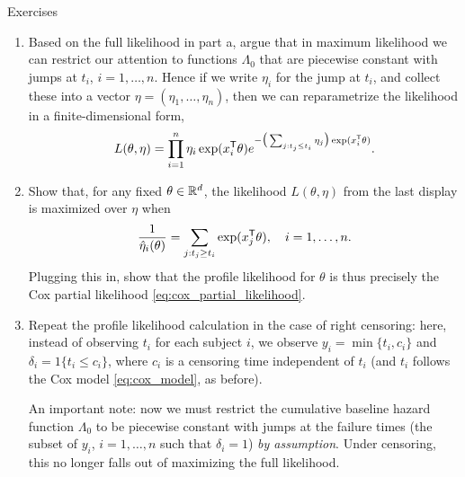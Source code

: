 \begin{xcb}{Exercises}
\begin{enumerate}[label=\thechapter.\arabic*]
\begin{enumerate}[label=\alph*.]
\item Based on the full likelihood in part a, argue that in maximum likelihood 
  we can restrict our attention to functions $\Lambda_0$ that are piecewise
  constant with jumps at $t_i$, $i=1,\dots,n$. Hence if we write $\eta_i$ for  
  the jump at $t_i$, and collect these into a vector $\eta = (\eta_1, \dots,
  \eta_n)$, then we can reparametrize the likelihood in a finite-dimensional
  form,     
  \[
  L(\theta, \eta) = \prod_{i=1}^n \eta_i \exp(x_i^{\mathsf{T}} \theta)
  e^{-\big(\sum_{j : t_j \leq t_i} \eta_j\big) \exp(x_i^{\mathsf{T}} \theta)}. 
  \]

\item Show that, for any fixed $\theta \in \mathbb{R}^d$, the likelihood $L(\theta,
  \eta)$ from the last display is maximized over $\eta$ when
  \[
  \frac{1}{\hat\eta_i(\theta)} = \sum_{j : t_j \geq t_i} \exp(x_j^{\mathsf{T}} \theta),
  \quad i=1,\dots,n. 
  \]
  Plugging this in, show that the profile likelihood for $\theta$ is thus
  precisely the Cox partial likelihood \eqref{eq:cox_partial_likelihood}. 

\item Repeat the profile likelihood calculation in the case of right censoring:
  here, instead of observing $t_i$ for each subject $i$, we observe $y_i =
  \min\{t_i, c_i\}$ and $\delta_i = 1\{t_i \leq c_i\}$, where $c_i$ is a
  censoring time independent of $t_i$ (and $t_i$ follows the Cox model
  \eqref{eq:cox_model}, as before).     

  \smallskip
  An important note: now we must restrict the cumulative baseline hazard
  function $\Lambda_0$ to be piecewise constant with jumps at the failure times
  (the subset of $y_i$, $i=1,\dots,n$ such that $\delta_i = 1$) \emph{by
    assumption}. Under censoring, this no longer falls out of maximizing the
  full likelihood.               
\end{enumerate} 
\end{enumerate}
\end{xcb}